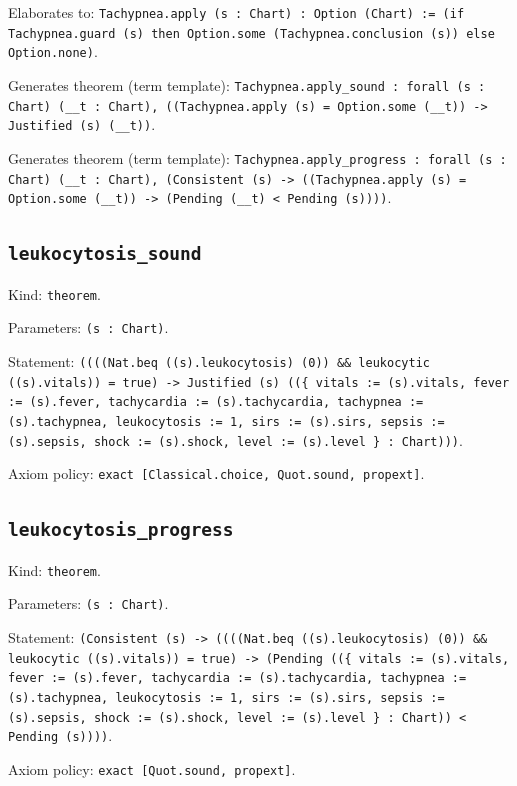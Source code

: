 \documentclass[11pt]{article}
\begin{document}
\noindent Elaborates to: \texttt{Tachypnea.apply (s : Chart) : Option (Chart) := (if Tachypnea.guard (s) then Option.some (Tachypnea.conclusion (s)) else Option.none)}.\par
\noindent Generates theorem (term template): \texttt{Tachypnea.apply\_sound : forall (s : Chart) (\_\_t : Chart), ((Tachypnea.apply (s) = Option.some (\_\_t)) -> Justified (s) (\_\_t))}.\par
\noindent Generates theorem (term template): \texttt{Tachypnea.apply\_progress : forall (s : Chart) (\_\_t : Chart), (Consistent (s) -> ((Tachypnea.apply (s) = Option.some (\_\_t)) -> (Pending (\_\_t) < Pending (s))))}.\par
\subsection*{\texttt{leukocytosis\_sound}}
\noindent Kind: \texttt{theorem}.\par
\noindent Parameters: \texttt{(s : Chart)}.\par
\noindent Statement: \texttt{((((Nat.beq ((s).leukocytosis) (0)) \&\& leukocytic ((s).vitals)) = true) -> Justified (s) ((\{ vitals := (s).vitals, fever := (s).fever, tachycardia := (s).tachycardia, tachypnea := (s).tachypnea, leukocytosis := 1, sirs := (s).sirs, sepsis := (s).sepsis, shock := (s).shock, level := (s).level \} : Chart)))}.\par
\noindent Axiom policy: \texttt{exact [Classical.choice, Quot.sound, propext]}.\par
\subsection*{\texttt{leukocytosis\_progress}}
\noindent Kind: \texttt{theorem}.\par
\noindent Parameters: \texttt{(s : Chart)}.\par
\noindent Statement: \texttt{(Consistent (s) -> ((((Nat.beq ((s).leukocytosis) (0)) \&\& leukocytic ((s).vitals)) = true) -> (Pending ((\{ vitals := (s).vitals, fever := (s).fever, tachycardia := (s).tachycardia, tachypnea := (s).tachypnea, leukocytosis := 1, sirs := (s).sirs, sepsis := (s).sepsis, shock := (s).shock, level := (s).level \} : Chart)) < Pending (s))))}.\par
\noindent Axiom policy: \texttt{exact [Quot.sound, propext]}.\par
\end{document}
